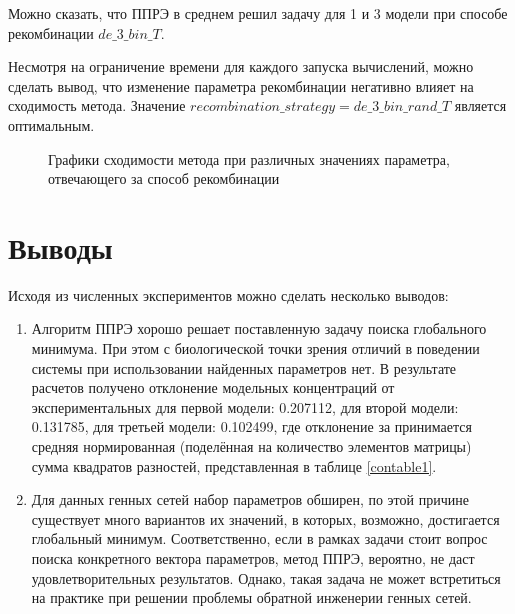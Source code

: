 Можно сказать, что ППРЭ в среднем решил задачу для 1 и 3 модели при способе 
рекомбинации $de\_3\_bin\_T$.

Несмотря на ограничение времени для каждого запуска вычислений, 
можно сделать вывод, что изменение параметра рекомбинации негативно влияет на 
сходимость метода. Значение $recombination\_strategy = de\_3\_bin\_rand\_T$
является оптимальным.

\begin{figure}[h]
  \caption{Графики сходимости метода при различных значениях параметра, 
  отвечающего за способ рекомбинации}
  \label{img:recombination}
\end{figure}


\clearpage
\section{Выводы} \label{s4}

Исходя из численных экспериментов можно сделать несколько выводов:

\begin{enumerate}
  \item Алгоритм ППРЭ хорошо решает поставленную задачу поиска глобального 
  минимума. При этом с биологической точки зрения отличий в поведении системы 
  при использовании найденных параметров нет.
  В результате расчетов получено отклонение модельных концентраций от 
  экспериментальных для первой модели: 0.207112, для второй модели: 0.131785, 
  для третьей модели: 0.102499, где отклонение за принимается средняя 
  нормированная (поделённая на количество элементов матрицы) сумма квадратов 
  разностей, представленная в таблице \ref{contable1}.
  \item Для данных генных сетей набор параметров обширен, по этой причине 
  существует много вариантов их значений, в которых, возможно, достигается 
  глобальный минимум. Соответственно, если в рамках задачи стоит вопрос поиска 
  конкретного вектора параметров, метод ППРЭ, вероятно, не даст 
  удовлетворительных результатов. Однако, такая задача не может встретиться 
  на практике при решении проблемы обратной инженерии генных сетей.
\end{enumerate}

\clearpage
